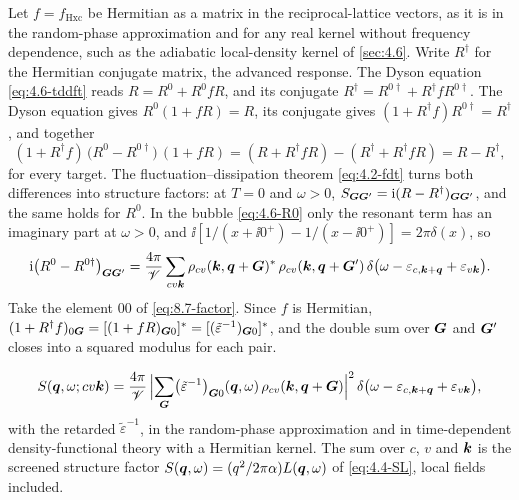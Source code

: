 Let $f = f_{\mathrm{Hxc}}$ be Hermitian as a matrix in the reciprocal-lattice vectors, as it is in the random-phase approximation and for any real kernel without frequency dependence, such as the adiabatic local-density kernel of \cref{sec:4.6}. Write $R^\dagger$ for the Hermitian conjugate matrix, the advanced response. The Dyson equation \cref{eq:4.6-tddft} reads $R = R^0 + R^0fR$, and its conjugate $R^\dagger = R^{0\dagger} + R^\dagger fR^{0\dagger}$. The Dyson equation gives $R^0(1 + fR) = R$, its conjugate gives $(1 + R^\dagger f)R^{0\dagger} = R^\dagger$, and together
\begin{equation}
  (1 + R^\dagger f)\,\bigl(R^0 - R^{0\dagger}\bigr)\,(1 + fR) = (R + R^\dagger fR) - (R^\dagger + R^\dagger fR) = R - R^\dagger ,
  \label{eq:8.7-factor}
\end{equation}
for every target. The fluctuation--dissipation theorem \cref{eq:4.2-fdt} turns both differences into structure factors: at $T = 0$ and $\omega > 0$, $S_{\bm{G}\bm{G}'} = \mathrm{i}(R - R^\dagger)_{\bm{G}\bm{G}'}$, and the same holds for $R^0$. In the bubble \cref{eq:4.6-R0} only the resonant term has an imaginary part at $\omega > 0$, and $\ii[1/(x + \ii0^+) - 1/(x - \ii0^+)] = 2\pi\delta(x)$, so
\begin{equation*}
  \mathrm{i}\bigl(R^0 - R^{0\dagger}\bigr)_{\bm{G}\bm{G}'} = \frac{4\pi}{\mathscr{V}}\sum_{cv\bm{k}}\rho_{cv}(\bm{k},\bm{q}+\bm{G})^*\,\rho_{cv}(\bm{k},\bm{q}+\bm{G}')\,\delta\bigl(\omega - \varepsilon_{c,\bm{k}+\bm{q}} + \varepsilon_{v\bm{k}}\bigr) .
\end{equation*}
Take the element $00$ of \cref{eq:8.7-factor}. Since $f$ is Hermitian, $(1 + R^\dagger f)_{0\bm{G}} = [(1 + fR)_{\bm{G}0}]^* = [(\tilde\varepsilon^{-1})_{\bm{G}0}]^*$, and the double sum over $\bm{G}$ and $\bm{G}'$ closes into a squared modulus for each pair.
\begin{keyresult}
\begin{equation}
  S(\bm{q},\omega;cv\bm{k}) = \frac{4\pi}{\mathscr{V}}\,\Bigl|\sum_{\bm{G}}\bigl(\tilde\varepsilon^{-1}\bigr)_{\bm{G}0}(\bm{q},\omega)\,\rho_{cv}(\bm{k},\bm{q}+\bm{G})\Bigr|^2\,\delta\bigl(\omega - \varepsilon_{c,\bm{k}+\bm{q}} + \varepsilon_{v\bm{k}}\bigr) ,
  \label{eq:8.7-screened}
\end{equation}
with the retarded $\tilde\varepsilon^{-1}$, in the random-phase approximation and in time-dependent density-functional theory with a Hermitian kernel. The sum over $c$, $v$ and $\bm{k}$ is the screened structure factor $S(\bm{q},\omega) = (q^2/2\pi\alpha)L(\bm{q},\omega)$ of \cref{eq:4.4-SL}, local fields included.
\end{keyresult}
